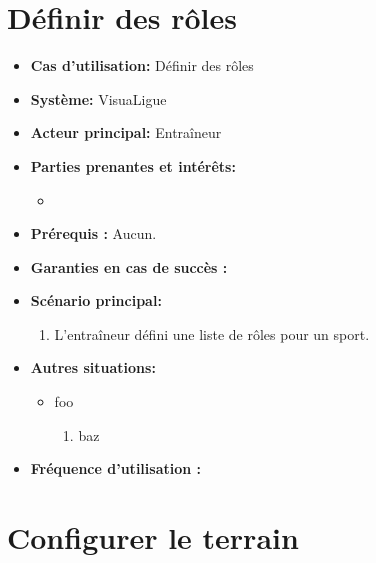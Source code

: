 \section{Définir des rôles}
\label{sec:definir_des_roles}

\begin{itemize}
    \item \textbf{Cas d'utilisation:} D\'efinir des r\^oles
    \item \textbf{Syst\`eme:} VisuaLigue
    \item \textbf{Acteur principal:} Entra\^ineur
    \item \textbf{Parties prenantes et int\'er\^ets:}
    	\begin{itemize}
    		\item
    	\end{itemize}
    \item \textbf{Pr\'erequis :} Aucun.
    \item \textbf{Garanties en cas de succ\`es :}
    \item \textbf{Sc\'enario principal:}
        \begin{enumerate}
            \item L'entraîneur défini une liste de rôles pour un sport.
        \end{enumerate}
    \item \textbf{Autres situations:}
        \begin{itemize}
            \item foo
                \begin{enumerate}
                    \item baz
                \end{enumerate}
        \end{itemize}
	\item \textbf{Fréquence d'utilisation :}
\end{itemize}



\section{Configurer le terrain}
\label{sec:configurer_le_terrain}

